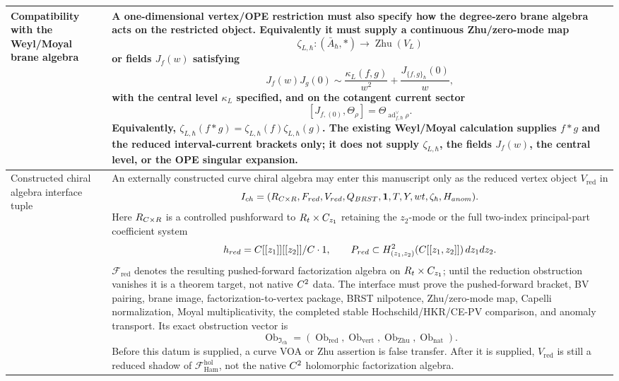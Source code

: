 \begin{longtable}{@{}>{\raggedright\arraybackslash}p{}
  >{\raggedright\arraybackslash}p{}@{}}
\hline
Compatibility with the Weyl/Moyal brane algebra &
A one-dimensional vertex/OPE restriction must also specify how the
degree-zero brane algebra acts on the restricted object.  Equivalently it
must supply a continuous Zhu/zero-mode map
\[
  \zeta_{L,\hbar}\colon
  (\bar A_\hbar,*)\longrightarrow \operatorname{Zhu}(V_L)
\]
or fields \(J_f(w)\) satisfying
\[
  J_f(w)J_g(0)
  \sim
  \frac{\kappa_L(f,g)}{w^2}
  +
  \frac{J_{\{f,g\}_\hbar}(0)}{w},
\]
with the central level \(\kappa_L\) specified, and on the cotangent
current sector
\[
  [J_{f,(0)},\Theta_\rho]
  =
  \Theta_{\operatorname{ad}^{\vee}_{f,\hbar}\rho}.
\]
Equivalently,
\(\zeta_{L,\hbar}(f*g)=\zeta_{L,\hbar}(f)\zeta_{L,\hbar}(g)\).
The existing Weyl/Moyal calculation supplies \(f*g\) and the reduced
interval-current brackets only; it does not supply \(\zeta_{L,\hbar}\),
the fields \(J_f(w)\), the central level, or the OPE singular expansion.\\
\hline
Constructed chiral algebra interface tuple &
An externally constructed curve chiral algebra may enter this manuscript
only as the reduced vertex object \(V_{\mathrm{red}}\) in
\[
  I_{ch}
  =
  (R_{C\times R},
   F_{red},
   V_{red},
   Q_{BRST},
   \mathbf 1,T,Y,
   wt,
   \zeta_{\hbar},
   H_{anom}).
\]
Here \(R_{C\times R}\) is a controlled pushforward to
\(R_t\times C_{z_1}\) retaining the \(z_2\)-mode or the full two-index
principal-part coefficient system
\[
  h_{red}=C[[z_1]][[z_2]]/C\cdot1,\qquad
  P_{red}\subset
  H^2_{(z_1,z_2)}(C[[z_1,z_2]])\,dz_1dz_2 .
\]
\(\mathcal F_{\mathrm{red}}\) denotes the resulting pushed-forward
factorization algebra on \(R_t\times C_{z_1}\); until the reduction
obstruction vanishes it is a theorem target, not native \(C^2\) data.
The interface must prove the pushed-forward bracket, BV pairing, brane
image, factorization-to-vertex package, BRST nilpotence, Zhu/zero-mode
map, Capelli normalization, Moyal multiplicativity, the completed stable
Hochschild/HKR/CE-PV comparison, and anomaly transport.  Its exact
obstruction vector is
\[
  \operatorname{Ob}_{\mathfrak I_{\mathrm{ch}}}
  =
  (\operatorname{Ob}_{\mathrm{red}},
   \operatorname{Ob}_{\mathrm{vert}},
   \operatorname{Ob}_{\mathrm{Zhu}},
   \operatorname{Ob}_{\mathrm{nat}}).
\]
Before this datum is supplied, a curve VOA or Zhu assertion is false
transfer.  After it is supplied, \(V_{\mathrm{red}}\) is still a reduced
shadow of \(\mathcal F_{\mathrm{Ham}}^{\mathrm{hol}}\), not the native
\(C^2\) holomorphic factorization algebra.\\
\hline
\end{longtable}

